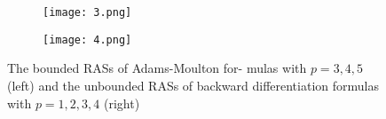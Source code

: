 \documentclass[lang=cn,a4paper,newtx,bibend=bibtex]{elegantpaper}
\begin{document}
\begin{figure}[H]
  \centering
  \begin{subfigure}[b]{0.45\textwidth}
      \texttt{[image: 3.png]}
  \end{subfigure}
  \hfill
  \begin{subfigure}[b]{0.45\textwidth}
      \texttt{[image: 4.png]}
  \end{subfigure}
  \caption{The bounded RASs of Adams-Moulton for-
  mulas with $p = 3, 4, 5$ (left) and the unbounded RASs of
  backward differentiation formulas with $p = 1, 2, 3, 4$ (right)}
\end{figure}


\nocite{*}
\printbibliography[heading=bibintoc, title=\ebibname]
\end{document}
